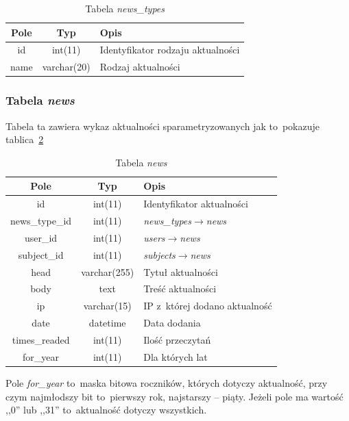 \documentclass[a4paper,12pt,oneside]{report}
\begin{document}
\begin{table}[h]
  \centering
  \begin{tabular}{|c|c|l|}\hline
  Pole & Typ & Opis \\\hline
  id              & int(11)      & Identyfikator rodzaju aktualności\\
  name & varchar(20) & Rodzaj aktualności \\\hline
  \end{tabular}
  \caption{Tabela \emph{news\_types}\label{tab:news_types}}
\end{table}

\newpage
\subsubsection{Tabela \emph{news}}
\label{subsub:news}
Tabela ta zawiera wykaz aktualności sparametryzowanych jak to~pokazuje tablica~\ref{tab:news}

\begin{table}[h]
  \centering
  \begin{tabular}{|c|c|l|}\hline
  Pole & Typ & Opis \\\hline
  id             & int(11)      & Identyfikator aktualności \\
  news\_type\_id & int(11)      & \emph{news\_types}$\to$\emph{news}\\
  user\_id       & int(11)      & \emph{users}$\to$\emph{news}\\
  subject\_id    & int(11)      & \emph{subjects}$\to$\emph{news}\\
  head           & varchar(255) & Tytuł aktualności \\
  body           & text         & Treść aktualności \\
  ip             & varchar(15)  & IP z~której dodano aktualność \\
  date           & datetime     & Data dodania \\
  times\_readed  & int(11)      & Ilość przeczytań \\
  for\_year      & int(11)      & Dla których lat \\\hline
  \end{tabular}
  \caption{Tabela \emph{news}\label{tab:news}}
\end{table}

Pole \emph{for\_year} to~maska bitowa roczników, których dotyczy aktualność, przy czym najmłodszy bit to~pierwszy rok, najstarszy -- piąty. Jeżeli pole ma wartość ,,0'' lub ,,31'' to~aktualność dotyczy wszystkich.
\end{document}

